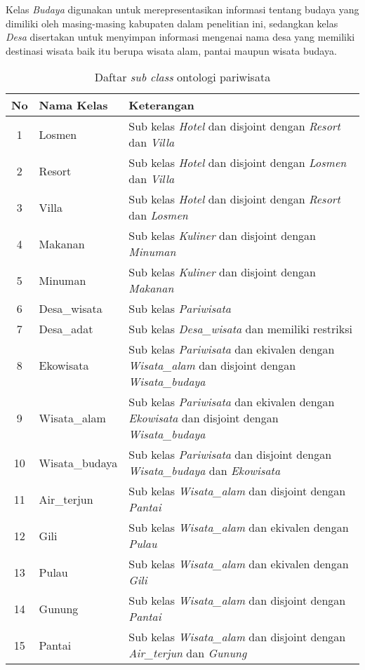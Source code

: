 Kelas \emph{Budaya} digunakan untuk merepresentasikan informasi tentang budaya yang dimiliki oleh masing-masing kabupaten dalam penelitian ini, sedangkan kelas \emph{Desa} disertakan untuk menyimpan informasi mengenai nama desa yang memiliki destinasi wisata baik itu berupa wisata alam, pantai maupun wisata budaya.

\begin{table}[hb]
	\caption{Daftar \emph{sub class} ontologi pariwisata}
	\label{tab:sub_class_ontopar}
	\centering

	\begin{tabularx}{\textwidth}{|c|l|X|}
	\hline

	\hline
	\textbf{No} & \textbf{Nama Kelas} & \textbf{Keterangan} \\
	\hline
		1 & Losmen & Sub kelas \emph{Hotel} dan disjoint dengan \emph{Resort} dan \emph{Villa}\\
	\hline
		2 & Resort & Sub kelas \emph{Hotel} dan disjoint dengan \emph{Losmen} dan \emph{Villa}\\
	\hline
		3 & Villa & Sub kelas \emph{Hotel} dan disjoint dengan \emph{Resort} dan \emph{Losmen}\\
	\hline
		4 & Makanan & Sub kelas \emph{Kuliner} dan disjoint dengan \emph{Minuman}\\
	\hline
		5 & Minuman & Sub kelas \emph{Kuliner} dan disjoint dengan \emph{Makanan}\\
	\hline
		6 & Desa\_wisata & Sub kelas \emph{Pariwisata}\\
	\hline
		7 & Desa\_adat & Sub kelas \emph{Desa\_wisata} dan memiliki restriksi\\
	\hline
		8 & Ekowisata & Sub kelas \emph{Pariwisata} dan ekivalen dengan \emph{Wisata\_alam} dan disjoint dengan \emph{Wisata\_budaya}\\
	\hline
		9 & Wisata\_alam & Sub kelas \emph{Pariwisata} dan ekivalen dengan \emph{Ekowisata} dan disjoint dengan \emph{Wisata\_budaya}\\
	\hline 
	   10 & Wisata\_budaya & Sub kelas \emph{Pariwisata} dan disjoint dengan \emph{Wisata\_budaya} dan \emph{Ekowisata}\\
	\hline
	   11 & Air\_terjun & Sub kelas \emph{Wisata\_alam} dan disjoint dengan \emph{Pantai}\\
	\hline
	   12 & Gili & Sub kelas \emph{Wisata\_alam} dan ekivalen dengan \emph{Pulau} \\
	\hline
	   13 & Pulau & Sub kelas \emph{Wisata\_alam} dan ekivalen dengan \emph{Gili}\\
	\hline 
	   14 & Gunung & Sub kelas \emph{Wisata\_alam} dan disjoint dengan \emph{Pantai}\\
	\hline
	   15 & Pantai & Sub kelas \emph{Wisata\_alam} dan disjoint dengan \emph{Air\_terjun} dan \emph{Gunung}\\
	\hline
	\end{tabularx}
\end{table}

